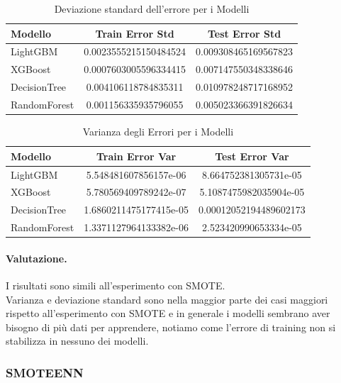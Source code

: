 \begin{table}[H]
    \centering
    \begin{tabular}{lcc}
    \toprule
    \textbf{Modello} & \textbf{Train Error Std} & \textbf{Test Error Std} \\
    \midrule
    LightGBM & 0.0023555215150484524 & 0.009308465169567823 \\
    XGBoost & 0.0007603005596334415 & 0.007147550348338646 \\
    DecisionTree & 0.004106118784835311 & 0.010978248717168952 \\
    RandomForest & 0.001156335935796055 & 0.005023366391826634 \\
    \bottomrule
    \end{tabular}
    \caption{Deviazione standard dell'errore per i Modelli}
    
\end{table}

\begin{table}[H]
    \centering
    \begin{tabular}{lcc}
    \toprule
    \textbf{Modello} & \textbf{Train Error Var} & \textbf{Test Error Var} \\
    \midrule
    LightGBM & 5.548481607856157e-06 & 8.664752381305731e-05 \\
    XGBoost & 5.780569409789242e-07 & 5.1087475982035904e-05 \\
    DecisionTree & 1.6860211475177415e-05 & 0.00012052194489602173 \\
    RandomForest & 1.3371127964133382e-06 & 2.523420990653334e-05 \\
    \bottomrule
    \end{tabular}
    \caption{Varianza degli Errori per i Modelli}
    
\end{table}

\paragraph{Valutazione.} I risultati sono simili all'esperimento con SMOTE. \\ Varianza e deviazione standard sono nella maggior parte dei casi maggiori rispetto all'esperimento con SMOTE e in generale i modelli sembrano aver bisogno di più dati per apprendere, notiamo come l'errore di training non si stabilizza in nessuno dei modelli.

\subsubsection{SMOTEENN}
